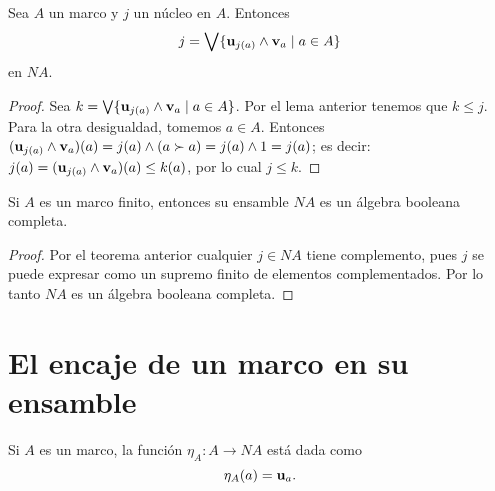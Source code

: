 \begin{thm}
  Sea $A$ un marco y $j$ un núcleo en $A$.
  Entonces
  \[
    j = \bigvee\{ \mathbf u_{j(a)}\wedge\mathbf v_{a} \mid a\in A\}
  \]
  en $NA$.
\end{thm}
\begin{proof}
Sea $k=\bigvee\{\mathbf u_{j(a)}\wedge \mathbf v_{a}\mid a\in A\}$.
Por el lema anterior tenemos que $k\leq j$.
Para la otra desigualdad, tomemos $a\in A$.
Entonces $(\mathbf u_{j(a)}\wedge \mathbf v_{a})(a)=j(a)\wedge (a\succ a)=j(a)\wedge 1=j(a)$;
es decir: $j(a)=(\mathbf u_{j(a)}\wedge \mathbf v_{a})(a)\leq k(a)$,
por lo cual $j\leq k$.
\end{proof}

\begin{cor}
  Si $A$ es un marco finito, entonces su ensamble $NA$ es un
  álgebra booleana completa.
\end{cor}
\begin{proof}
Por el teorema anterior cualquier $j\in NA$ tiene complemento, pues $j$ se puede expresar como un supremo finito de elementos complementados. Por lo tanto $NA$ es un álgebra booleana completa.
\end{proof}

\section{El encaje de un marco en su ensamble}

\begin{defn}
  Si $A$ es un marco, la función $\eta_A:A\to NA$ está dada como
  \[
    \eta_A(a) = \mathbf u_{a}
  .\]
\end{defn}

